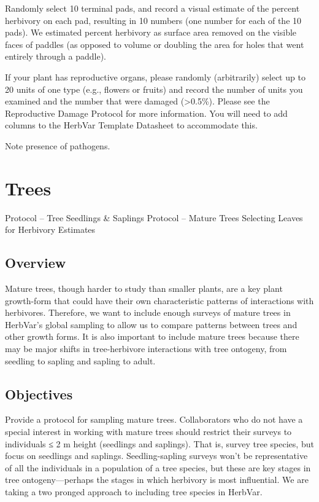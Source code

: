 \documentclass[
  letterpaper,
  oneside,
  open=any]{scrbook}
\begin{document}
Randomly select 10 terminal pads, and record a visual estimate of the
percent herbivory on each pad, resulting in 10 numbers (one number for
each of the 10 pads). We estimated percent herbivory as surface area
removed on the visible faces of paddles (as opposed to volume or
doubling the area for holes that went entirely through a paddle).

If your plant has reproductive organs, please randomly (arbitrarily)
select up to 20 units of one type (e.g., flowers or fruits) and record
the number of units you examined and the number that were damaged
(\textgreater0.5\%). Please see the Reproductive Damage Protocol for
more information. You will need to add columns to the HerbVar Template
Datasheet to accommodate this.

Note presence of pathogens.

\chapter{Trees}\label{sec-tree}

Protocol -- Tree Seedlings \& Saplings Protocol -- Mature Trees
Selecting Leaves for Herbivory Estimates

\section{Overview}\label{overview-3}

Mature trees, though harder to study than smaller plants, are a key
plant growth-form that could have their own characteristic patterns of
interactions with herbivores. Therefore, we want to include enough
surveys of mature trees in HerbVar's global sampling to allow us to
compare patterns between trees and other growth forms. It is also
important to include mature trees because there may be major shifts in
tree-herbivore interactions with tree ontogeny, from seedling to sapling
and sapling to adult.

\section{Objectives}\label{objectives}

Provide a protocol for sampling mature trees. Collaborators who do not
have a special interest in working with mature trees should restrict
their surveys to individuals ≤ 2 m height (seedlings and saplings). That
is, survey tree species, but focus on seedlings and saplings.
Seedling-sapling surveys won't be representative of all the individuals
in a population of a tree species, but these are key stages in tree
ontogeny---perhaps the stages in which herbivory is most influential. We
are taking a two pronged approach to including tree species in HerbVar.
\end{document}
